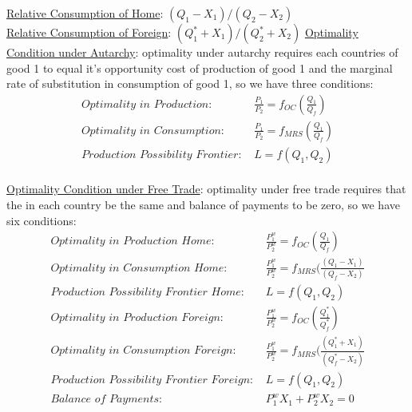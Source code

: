 \documentclass{article}
\begin{document}
\underline{Relative Consumption of Home}: $(Q_{1}-X_{1})/(Q_{2}-X_{2})$ \\
\underline{Relative Consumption of Foreign}: $(Q_{1}^{*}+X_{1})/(Q_{2}^{*}+X_{2})$
\underline{Optimality Condition under Autarchy}: optimality under autarchy requires each countries  of good 1 to equal it's opportunity cost of production of good 1 and the marginal rate of substitution in consumption of good 1, so we have three conditions:
\begin{align*}
  \textit{Optimality in Production: }& \tfrac{P_{1}}{P_{2}} = f_{OC}(\tfrac{Q_{1}}{Q_{f}}) \\
  \textit{Optimality in Consumption: }& \tfrac{P_{1}}{P_{2}} = f_{MRS}(\tfrac{Q_{1}}{Q_{f}}) \\
  \textit{Production Possibility Frontier: }& L = f(Q_{1}, Q_{2})
\end{align*} \\
\underline{Optimality Condition under Free Trade}: optimality under free trade requires that the  in each country be the same and balance of payments to be zero, so we have six conditions:
\begin{align*}
  \textit{Optimality in Production Home: }& \tfrac{P_{1}^{w}}{P_{2}^{w}} = f_{OC}(\tfrac{Q_{1}}{Q_{f}}) \\
  \textit{Optimality in Consumption Home: }& \tfrac{P_{1}^{w}}{P_{2}^{w}} = f_{MRS}(\tfrac{(Q_{1}-X_{1})}{(Q_{f}-X_{2})} \\
  \textit{Production Possibility Frontier Home: }& L = f(Q_{1}, Q_{2}) \\
  \textit{Optimality in Production Foreign: }& \tfrac{P_{1}^{w}}{P_{2}^{w}} = f_{OC}(\tfrac{Q_{1}^{*}}{Q_{f}^{*}}) \\
  \textit{Optimality in Consumption Foreign: }& \tfrac{P_{1}^{w}}{P_{2}^{w}} = f_{MRS}(\tfrac{(Q_{1}^{*}+X_{1})}{(Q_{f}^{*}-X_{2})} \\
  \textit{Production Possibility Frontier Foreign: }& L = f(Q_{1}, Q_{2}) \\
  \textit{Balance of Payments: }& P_{1}^{w}X_{1} + P_{2}^{w}X_{2} = 0
\end{align*}

\newpage
\end{document}
